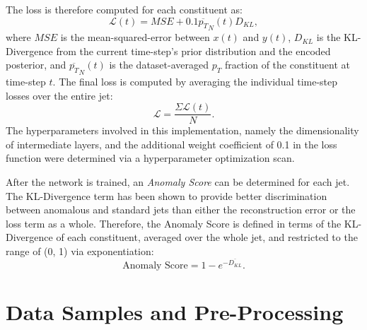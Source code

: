 \documentclass[12pt, a4paper]{article}
\begin{document}
The loss is therefore computed for each constituent as:
\begin{equation}
\mathcal{L}(t)=MSE+0.1\overline{p_{T}}_{N}(t)D_{KL},
\end{equation}
where $MSE$ is the mean-squared-error between $x(t)$ and $y(t)$, $D_{KL}$ is the KL-Divergence from the current time-step's prior distribution and the encoded posterior, and $\overline{p_T}_{N}(t)$ is the dataset-averaged $p_T$ fraction of the constituent at time-step $t$. The final loss is computed by averaging the individual time-step losses over the entire jet: 
\begin{equation}
\mathcal{L} = \frac{\Sigma \mathcal{L}(t)}{N}.
\end{equation} 
The hyperparameters involved in this implementation, namely the dimensionality of intermediate layers, and the additional weight coefficient of 0.1 in the loss function were determined via a hyperparameter optimization scan. 

After the network is trained, an \textit{Anomaly Score} can be determined for each jet. The KL-Divergence term has been shown to provide better discrimination between anomalous and standard jets than either the reconstruction error or the loss term as a whole. Therefore, the Anomaly Score is defined in terms of the KL-Divergence of each constituent, averaged over the whole jet, and restricted to the range of (0, 1) via exponentiation:
\begin{equation}
	\text{Anomaly Score} = 1 - e^{-\overline{D_{KL}}}.
\end{equation}




\section{Data Samples and Pre-Processing}
\end{document}
